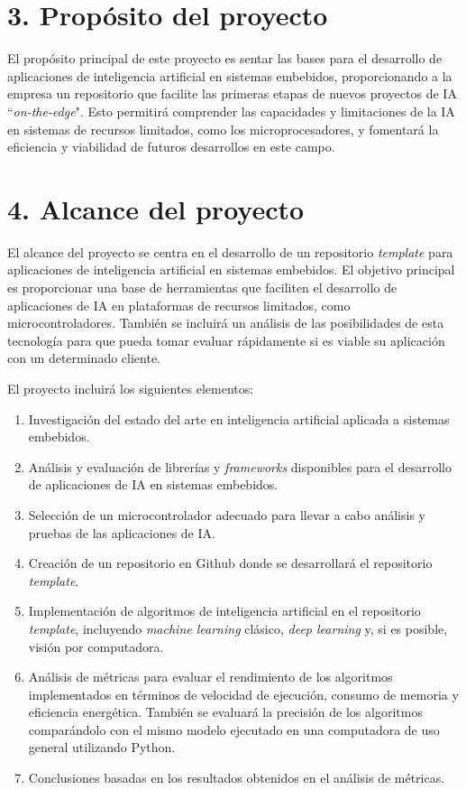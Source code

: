 \documentclass[
11pt, %
codirector, %
]{charter}
\begin{document}
\section{3. Propósito del proyecto}
\label{sec:proposito}

El propósito principal de este proyecto es sentar las bases para el desarrollo de aplicaciones de inteligencia artificial en sistemas embebidos, proporcionando a la empresa un repositorio que facilite las primeras etapas de nuevos proyectos de IA ``\textit{on-the-edge}". Esto permitirá comprender las capacidades y limitaciones de la IA en sistemas de recursos limitados, como los microprocesadores, y fomentará la eficiencia y viabilidad de futuros desarrollos en este campo.

\section{4. Alcance del proyecto}
\label{sec:alcance}

El alcance del proyecto se centra en el desarrollo de un repositorio \textit{template} para aplicaciones de inteligencia artificial en sistemas embebidos. El objetivo principal es proporcionar una base de herramientas que faciliten el desarrollo de aplicaciones de IA en plataformas de recursos limitados, como microcontroladores. También se incluirá un análisis de las posibilidades de esta tecnología para que \empclientename pueda tomar evaluar rápidamente si es viable su aplicación con un determinado cliente.

El proyecto incluirá los siguientes elementos:

\begin{enumerate}
\item Investigación del estado del arte en inteligencia artificial aplicada a sistemas embebidos.
\item Análisis y evaluación de librerías y \textit{frameworks} disponibles para el desarrollo de aplicaciones de IA en sistemas embebidos.
\item Selección de un microcontrolador adecuado para llevar a cabo análisis y pruebas de las aplicaciones de IA.
\item Creación de un repositorio en Github donde se desarrollará el repositorio \textit{template}.
\item Implementación de algoritmos de inteligencia artificial en el repositorio \textit{template}, incluyendo \textit{machine learning} clásico, \textit{deep learning} y, si es posible, visión por computadora.
\item Análisis de métricas para evaluar el rendimiento de los algoritmos implementados en términos de velocidad de ejecución, consumo de memoria y eficiencia energética. También se evaluará la precisión de los algoritmos comparándolo con el mismo modelo ejecutado en una computadora de uso general utilizando Python.
\item Conclusiones basadas en los resultados obtenidos en el análisis de métricas.
\end{enumerate}
\end{document}
